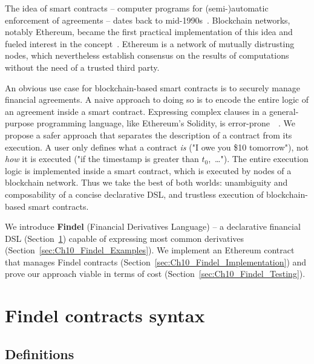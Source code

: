 The idea of smart contracts -- computer programs for (semi-)automatic enforcement of agreements -- dates back to mid-1990s~\cite{Szabo1997}.
Blockchain networks, notably Ethereum, became the first practical implementation of this idea and fueled interest in the concept~\cite{Castillo2016}.
Ethereum is a network of mutually distrusting nodes, which nevertheless establish consensus on the results of computations without the need of a trusted third party.

An obvious use case for blockchain-based smart contracts is to securely manage financial agreements.
A naive approach to doing so is to encode the entire logic of an agreement inside a smart contract.
Expressing complex clauses in a general-purpose programming language, like Ethereum's Solidity, is error-prone~\cite{Atzei2017}~\cite{Sirer2016}.
We propose a safer approach that separates the description of a contract from its execution.
A user only defines what a contract \textit{is} ("I owe you \$10 tomorrow"), not \textit{how} it is executed ("if the timestamp is greater than $t_0$,~\dots").
The entire execution logic is implemented inside a smart contract, which is executed by nodes of a blockchain network.
Thus we take the best of both worlds: unambiguity and composability of a concise declarative DSL, and trustless execution of blockchain-based smart contracts.

We introduce \textbf{Findel} (Financial Derivatives Language) -- a declarative financial DSL (Section~\ref{sec:Ch10_Findel_Syntax}) capable of expressing most common derivatives (Section~\ref{sec:Ch10_Findel_Examples}).
We implement an Ethereum contract that manages Findel contracts (Section~\ref{sec:Ch10_Findel_Implementation}) and prove our approach viable in terms of cost (Section~\ref{sec:Ch10_Findel_Testing}).


\section{Findel contracts syntax} \label{sec:Ch10_Findel_Syntax}

\subsection{Definitions} \label{sec:Ch10_Findel_Definitions}

